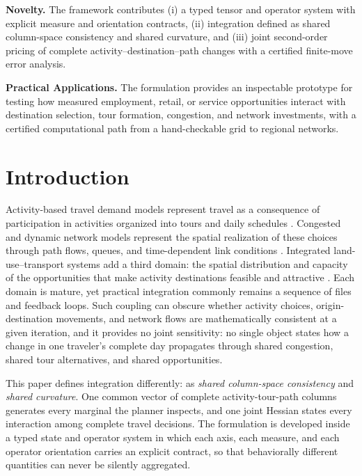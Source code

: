 \documentclass[10pt]{article}
\begin{document}
\textbf{Novelty.}
The framework contributes (i) a typed tensor and operator system with explicit measure and orientation contracts, (ii) integration defined as shared column-space consistency and shared curvature, and (iii) joint second-order pricing of complete activity--destination--path changes with a certified finite-move error analysis.

\textbf{Practical Applications.}
The formulation provides an inspectable prototype for testing how measured employment, retail, or service opportunities interact with destination selection, tour formation, congestion, and network investments, with a certified computational path from a hand-checkable grid to regional networks.

\newpage

\section{Introduction}
Activity-based travel demand models represent travel as a consequence of participation in activities organized into tours and daily schedules \parencite{pendyala1998,bowman2001}. Congested and dynamic network models represent the spatial realization of these choices through path flows, queues, and time-dependent link conditions \parencite{peeta2001,zhou2014}. Integrated land-use--transport systems add a third domain: the spatial distribution and capacity of the opportunities that make activity destinations feasible and attractive \parencite{pendyala2012}. Each domain is mature, yet practical integration commonly remains a sequence of files and feedback loops. Such coupling can obscure whether activity choices, origin-destination movements, and network flows are mathematically consistent at a given iteration, and it provides no joint sensitivity: no single object states how a change in one traveler's complete day propagates through shared congestion, shared tour alternatives, and shared opportunities.

This paper defines integration differently: as \emph{shared column-space consistency} and \emph{shared curvature}. One common vector of complete activity-tour-path columns generates every marginal the planner inspects, and one joint Hessian states every interaction among complete travel decisions. The formulation is developed inside a typed state and operator system in which each axis, each measure, and each operator orientation carries an explicit contract, so that behaviorally different quantities can never be silently aggregated.
\end{document}
